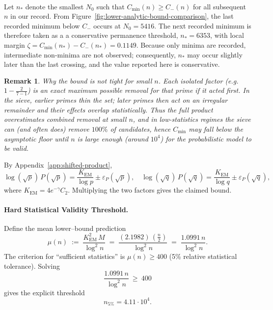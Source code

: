 \documentclass[11pt]{article}
\makeatletter
\theoremstyle{inline}
\newtheorem*{remark}{Remark}
\theoremstyle{break}
\renewenvironment{proof}[1][\proofname]{%
  \par\pushQED{\qed}%
  \normalfont \topsep6\p@\@plus6\p@\relax
  \trivlist
  \item[\hskip\labelsep
        \itshape
    #1\@addpunct{.}]\mbox{}\\  %
}{%
  \popQED\endtrivlist\@endpefalse
}
\theoremstyle{break}
\theoremstyle{break}
\theoremstyle{break}
\theoremstyle{break}
\theoremstyle{break}
\theoremstyle{break}
\theoremstyle{inline}
\newcommand{\xPreMertens}{5416} %
\newcommand{\xMertens}{6353} %
\newcommand{\xDeltaMertens}{0.1149}  %
\newcommand{\Cmeas}{C}              %
\newcommand{\CminusProduct}{C_{-}}
\newcommand{\Kem}{K_{\mathrm{EM}}}              %
\newcommand{\nprodstar}{n_{\ast}}  %
\makeatother
\begin{document}
\begin{proof}
Let \(\nprodstar\) denote the smallest \(N_0\) such that \(\Cmeas_{\min}(n) \ge \CminusProduct(n)\) for all subsequent \(n\) in our record.
From Figure~\ref{fig:lower-analytic-bound-comparison}, the last recorded minimum below \(\CminusProduct\) occurs at \(N_0 = \xPreMertens \).
The next recorded minimum is therefore taken as a
a conservative permanence threshold, \(\nprodstar = \xMertens\), with local margin
\(\zeta = \Cmeas_{\min}(\nprodstar) - \CminusProduct(\nprodstar) = \xDeltaMertens \).
Because only minima are recorded, intermediate non-minima are not observed; consequently, \(\nprodstar\) may occur slightly later than
the last crossing, and the value reported here is conservative.

\begin{remark}
Why the bound is not tight for small \(n\).
Each isolated factor (e.g.\ \(1-\tfrac{2}{7-1}\)) is an exact maximum possible removal for that prime \emph{if} it acted first.
In the sieve, earlier primes thin the set; later primes then act on an irregular remainder and their effects overlap statistically.
Thus the full product overestimates combined removal at small \(n\), and in low-statistics regimes the sieve can (and often does)
remove \(100\%\) of candidates, hence \(\Cmeas_{\min}\) may fall below the asymptotic floor until \(n\) is large enough
(around \(10^4\)) for the probabilistic model to be valid.
\end{remark}

By Appendix~\ref{app:shifted-product},
\begin{equation}
\log(\sqrt{p})\,P(\sqrt{p}) = \frac{\Kem}{\log p} \pm \varepsilon_P(\sqrt{p}),
\quad
\log(\sqrt{q})\,P(\sqrt{q}) = \frac{\Kem}{\log q} \pm \varepsilon_P(\sqrt{q}),
\end{equation}
where \( \Kem = 4 e^{-\gamma} C_2 \).
Multiplying the two factors gives the claimed bound.

\paragraph{Hard Statistical Validity Threshold.}
Define the mean lower–bound prediction
\begin{equation}
\mu(n)\;:=\;\frac{\Kem^2\,M}{\log^2 n}
\;=\;\frac{(2.1982)\,\left(\frac{n}{2}\right)}{\log^2 n}
\;=\;\frac{1.0991\,n}{\log^2 n}.
\end{equation}
The criterion for “sufficient statistics” is \(\mu(n)\ge 400\) (5\% relative statistical tolerance). Solving
\begin{equation}
\frac{1.0991\,n}{\log^2 n}\ \ge\ 400
\end{equation}
gives the explicit threshold
\begin{equation}
n_{5\%}=4.11\cdot 10^{4}.
\end{equation}


\end{proof}
\end{document}
